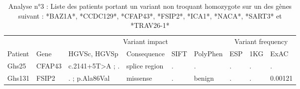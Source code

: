 \documentclass[12pt,twoside]{reedthesis}
\theoremstyle{definition}
\theoremstyle{definition}
\theoremstyle{remark}
\begin{document}
  \begin{landscape}
  \begin{longtable}[t]{lllllllll}
  \caption{\label{tab:tabgrp2moderate}Analyse n°3 : Liste des patients portant un variant non troquant homozygote sur un des gènes suivant : *BAZ1A*, *CCDC129*, *CFAP43*, *FSIP2*, *ICA1*, *NACA*, *SART3*  et  *TRAV26-1*}\\
  \toprule
  \multicolumn{1}{c}{ } & \multicolumn{1}{c}{ } & \multicolumn{4}{c}{Variant impact} & \multicolumn{3}{c}{Variant frequency} \\
  \cmidrule(l{2pt}r{2pt}){3-6} \cmidrule(l{2pt}r{2pt}){7-9}
  Patient & Gene & HGVSc, HGVSp & Consequence & SIFT & PolyPhen & ESP & 1KG & ExAC\\
  \midrule
  Ghs25 & CFAP43 & c.2141+5T>A ; . & splice region & . & . & . & . & .\\
  Ghs131 & FSIP2 & . ; p.Ala86Val & missense & . & benign & . & . & 0.00121\\
  \bottomrule
  \end{longtable}
  \end{landscape}
  
\end{document}

